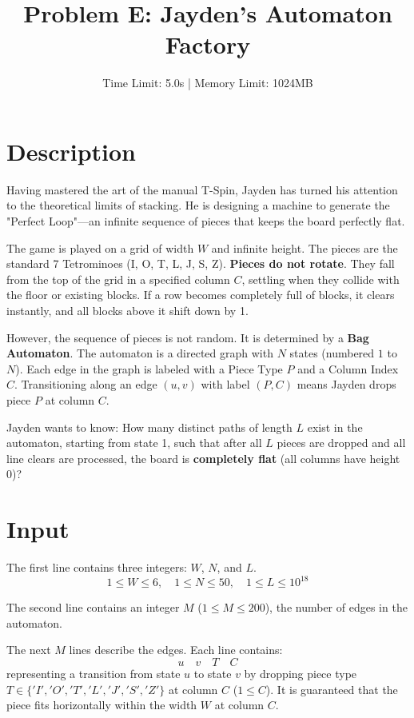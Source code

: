 \documentclass[11pt, letterpaper]{article}
\title{\textbf{Problem E: Jayden's Automaton Factory}}
\author{Time Limit: 5.0s | Memory Limit: 1024MB}
\date{}
\begin{document}
\maketitle

\section*{Description}

Having mastered the art of the manual T-Spin, Jayden has turned his attention to the theoretical limits of stacking. He is designing a machine to generate the "Perfect Loop"---an infinite sequence of pieces that keeps the board perfectly flat.

The game is played on a grid of width $W$ and infinite height.
The pieces are the standard 7 Tetrominoes (I, O, T, L, J, S, Z).
\textbf{Pieces do not rotate}. They fall from the top of the grid in a specified column $C$, settling when they collide with the floor or existing blocks. If a row becomes completely full of blocks, it clears instantly, and all blocks above it shift down by 1.

However, the sequence of pieces is not random. It is determined by a \textbf{Bag Automaton}.
The automaton is a directed graph with $N$ states (numbered $1$ to $N$). Each edge in the graph is labeled with a Piece Type $P$ and a Column Index $C$.
Transitioning along an edge $(u, v)$ with label $(P, C)$ means Jayden drops piece $P$ at column $C$.

Jayden wants to know: How many distinct paths of length $L$ exist in the automaton, starting from state 1, such that after all $L$ pieces are dropped and all line clears are processed, the board is \textbf{completely flat} (all columns have height 0)?

\section*{Input}

The first line contains three integers: $W$, $N$, and $L$.
$$ 1 \le W \le 6, \quad 1 \le N \le 50, \quad 1 \le L \le 10^{18} $$

The second line contains an integer $M$ ($1 \le M \le 200$), the number of edges in the automaton.

The next $M$ lines describe the edges. Each line contains:
$$ u \quad v \quad T \quad C $$
representing a transition from state $u$ to state $v$ by dropping piece type $T \in \{'I', 'O', 'T', 'L', 'J', 'S', 'Z'\}$ at column $C$ ($1 \le C$).
It is guaranteed that the piece fits horizontally within the width $W$ at column $C$.
\end{document}
